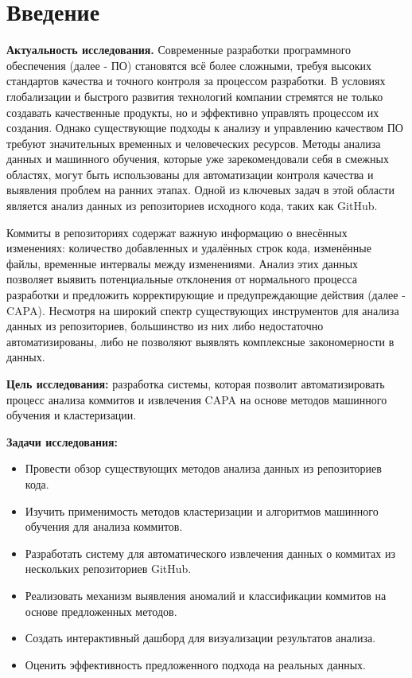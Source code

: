 \chapter*{Введение} %

\textbf{Актуальность исследования.} Современные разработки программного обеспечения (далее - ПО) становятся всё более сложными, требуя высоких стандартов качества и точного контроля за процессом разработки. В условиях глобализации и быстрого развития технологий компании стремятся не только создавать качественные продукты, но и эффективно управлять процессом их создания. Однако существующие подходы к анализу и управлению качеством ПО требуют значительных временных и человеческих ресурсов. Методы анализа данных и машинного обучения, которые уже зарекомендовали себя в смежных областях, могут быть использованы для автоматизации контроля качества и выявления проблем на ранних этапах. Одной из ключевых задач в этой области является анализ данных из репозиториев исходного кода, таких как GitHub.

Коммиты в репозиториях содержат важную информацию о внесённых изменениях: количество добавленных и удалённых строк кода, изменённые файлы, временные интервалы между изменениями. Анализ этих данных позволяет выявить потенциальные отклонения от нормального процесса разработки и предложить корректирующие и предупреждающие действия (далее - CAPA). Несмотря на широкий спектр существующих инструментов для анализа данных из репозиториев, большинство из них либо недостаточно автоматизированы, либо не позволяют выявлять комплексные закономерности в данных.

\textbf{Цель исследования:} разработка системы, которая позволит автоматизировать процесс анализа коммитов и извлечения CAPA на основе методов машинного обучения и кластеризации.

\textbf{Задачи исследования:}
\begin{itemize}
	\item Провести обзор существующих методов анализа данных из репозиториев кода.
	\item Изучить применимость методов кластеризации и алгоритмов машинного обучения для анализа коммитов.
	\item Разработать систему для автоматического извлечения данных о коммитах из нескольких репозиториев GitHub.
	\item Реализовать механизм выявления аномалий и классификации коммитов на основе предложенных методов.
	\item Создать интерактивный дашборд для визуализации результатов анализа.
	\item Оценить эффективность предложенного подхода на реальных данных.
\end{itemize}

